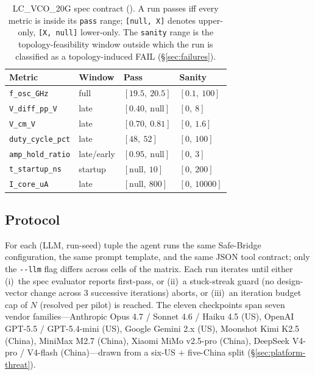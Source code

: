 \begin{table}[t]
  \centering
  \caption{LC\_VCO\_20G spec contract ().
    A run passes iff every metric is inside its \texttt{pass}
    range; \texttt{[null,\ X]} denotes upper-only,
    \texttt{[X,\ null]} lower-only. The \texttt{sanity} range is
    the topology-feasibility window outside which the run is
    classified as a topology-induced FAIL (\S\ref{sec:failures}).}
  \label{tab:spec}
  \footnotesize
  \setlength{\tabcolsep}{3.5pt}
  \begin{tabular}{l l l l}
    \toprule
    \textbf{Metric} & \textbf{Window} & \textbf{Pass} & \textbf{Sanity} \\
    \midrule
    \texttt{f\_osc\_GHz}      & full         & $[19.5,\ 20.5]$    & $[0.1,\ 100]$ \\
    \texttt{V\_diff\_pp\_V}   & late         & $[0.40,\ \text{null}]$ & $[0,\ 8]$ \\
    \texttt{V\_cm\_V}         & late         & $[0.70,\ 0.81]$    & $[0,\ 1.6]$ \\
    \texttt{duty\_cycle\_pct} & late         & $[48,\ 52]$        & $[0,\ 100]$ \\
    \texttt{amp\_hold\_ratio} & late/early   & $[0.95,\ \text{null}]$ & $[0,\ 3]$ \\
    \texttt{t\_startup\_ns}   & startup      & $[\text{null},\ 10]$ & $[0,\ 200]$ \\
    \texttt{I\_core\_uA}      & late         & $[\text{null},\ 800]$ & $[0,\ 10000]$ \\
    \bottomrule
  \end{tabular}
\end{table}

\subsection{Protocol}
\label{sec:method-protocol}

For each (LLM, run-seed) tuple the agent runs the same Safe-Bridge
configuration, the same prompt template, and the same JSON tool
contract; only the \texttt{-{}-llm} flag differs across cells of the
matrix. Each run iterates until either (i)~the spec evaluator
reports first-pass, or (ii)~a stuck-streak guard (no design-vector
change across 3 successive iterations) aborts, or (iii)~an
iteration budget cap of $N$ (resolved per pilot) is reached. The eleven
checkpoints span seven vendor families---Anthropic Opus 4.7 /
Sonnet 4.6 / Haiku 4.5 (US), OpenAI GPT-5.5 / GPT-5.4-mini (US),
Google Gemini 2.x (US), Moonshot Kimi K2.5 (China),
MiniMax M2.7 (China), Xiaomi MiMo v2.5-pro (China), DeepSeek
V4-pro / V4-flash (China)---drawn from a six-US + five-China split
(\S\ref{sec:platform-threat}).

